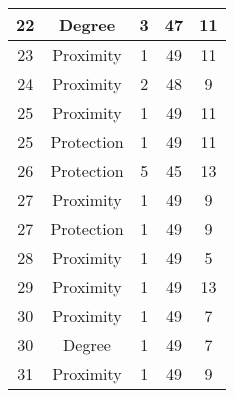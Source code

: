 \documentclass[results.tex]{subfiles}
\begin{document}
\begin{center}
\begin{tabular}{| c || c | c | c | c |}
            \hline
            22                      & Degree                       & 3                      & 47                      & 11                   \\
            \hline
            23                      & Proximity                    & 1                      & 49                      & 11                   \\
            \hline
            24                      & Proximity                    & 2                      & 48                      & 9                    \\
            \hline
            25                      & Proximity                    & 1                      & 49                      & 11                   \\
            \hline
            25                      & Protection                   & 1                      & 49                      & 11                   \\
            \hline
            26                      & Protection                   & 5                      & 45                      & 13                   \\
            \hline
            27                      & Proximity                    & 1                      & 49                      & 9                    \\
            \hline
            27                      & Protection                   & 1                      & 49                      & 9                    \\
            \hline
            28                      & Proximity                    & 1                      & 49                      & 5                    \\
            \hline
            29                      & Proximity                    & 1                      & 49                      & 13                   \\
            \hline
            30                      & Proximity                    & 1                      & 49                      & 7                    \\
            \hline
            30                      & Degree                       & 1                      & 49                      & 7                    \\
            \hline
            31                      & Proximity                    & 1                      & 49                      & 9                    \\

\end{tabular}
\end{center}
\end{document}
